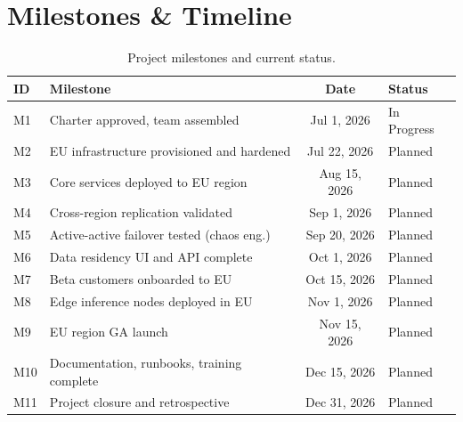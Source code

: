 \documentclass[
    language=english,
    doctype=project-charter,
    institution=none,
]{../../omnilatex}
\begin{document}
\section{Milestones \& Timeline}

\begin{table}[h]
    \centering
    \begin{tabular}{llcl}
        \toprule
        \textbf{ID} & \textbf{Milestone} & \textbf{Date} & \textbf{Status} \\
        \midrule
        M1  & Charter approved, team assembled           & Jul 1, 2026   & In Progress \\
        M2  & EU infrastructure provisioned and hardened  & Jul 22, 2026  & Planned \\
        M3  & Core services deployed to EU region         & Aug 15, 2026  & Planned \\
        M4  & Cross-region replication validated          & Sep 1, 2026   & Planned \\
        M5  & Active-active failover tested (chaos eng.)  & Sep 20, 2026  & Planned \\
        M6  & Data residency UI and API complete          & Oct 1, 2026   & Planned \\
        M7  & Beta customers onboarded to EU              & Oct 15, 2026  & Planned \\
        M8  & Edge inference nodes deployed in EU         & Nov 1, 2026   & Planned \\
        M9  & EU region GA launch                         & Nov 15, 2026  & Planned \\
        M10 & Documentation, runbooks, training complete  & Dec 15, 2026  & Planned \\
        M11 & Project closure and retrospective           & Dec 31, 2026  & Planned \\
        \bottomrule
    \end{tabular}
    \caption{Project milestones and current status.}
\end{table}
\end{document}
